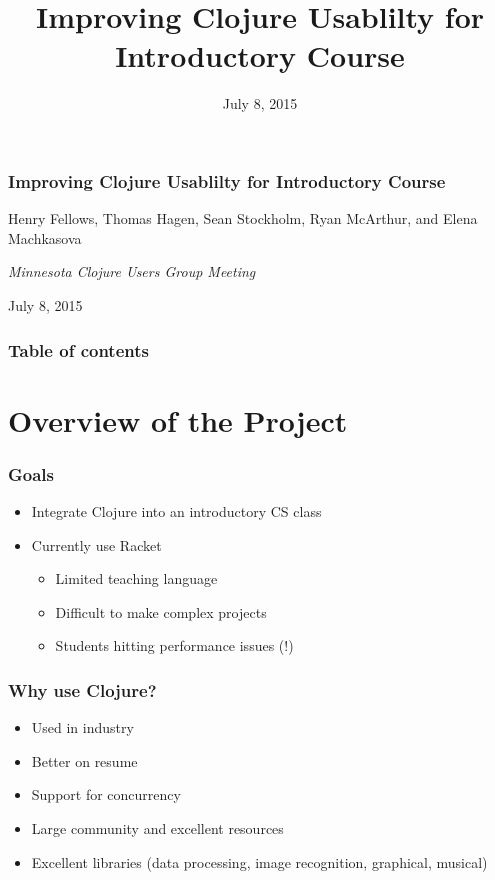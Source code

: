 \documentclass{beamer}
\begin{document}
\title{Improving Clojure Usablilty for Introductory Course}
\date{July 8, 2015}

\begin{frame}
\frametitle {Improving Clojure Usablilty for Introductory Course}
{\centering
\noindent
Henry Fellows, Thomas Hagen, Sean Stockholm, Ryan McArthur, and Elena Machkasova \par

{\it 
Minnesota Clojure Users Group Meeting\par
July 8, 2015\par}
}
\end{frame}

\begin{frame}
\frametitle{Table of contents}
\tableofcontents  
\end{frame}

\section{Overview of the Project}

\begin{frame}
	\frametitle{Goals}
	\begin{itemize}
		\item Integrate Clojure into an introductory CS class
		\item Currently use Racket
		\begin{itemize}
			\item Limited teaching language
			\item Difficult to make complex projects
			\item Students hitting performance issues (!)
		\end{itemize}
	\end{itemize}
\end{frame}

\begin{frame}
	\frametitle{Why use Clojure?}
	\begin{itemize}
		\item Used in industry
		\item Better on resume
		\item Support for concurrency
		\item Large community and excellent resources
		\item Excellent libraries (data processing, image recognition, graphical, musical)
	\end{itemize}
\end{frame}
\end{document}
